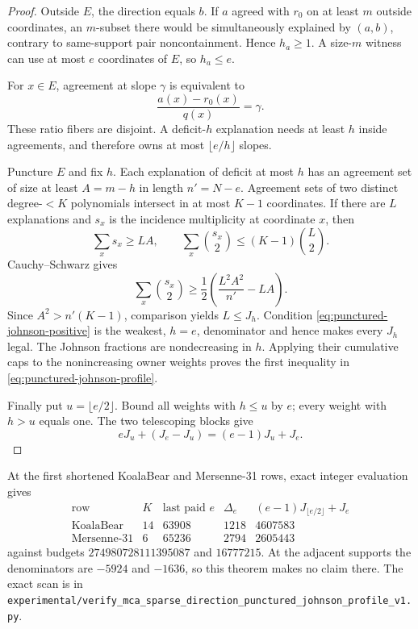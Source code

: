 \documentclass[11pt,a4paper]{amsart}
\numberwithin{equation}{section}
\theoremstyle{remark}
\begin{document}
\begin{proof}
Outside \(E\), the direction equals \(b\).  If \(a\) agreed with \(r_0\)
on at least \(m\) outside coordinates, an \(m\)-subset there would be
simultaneously explained by \((a,b)\), contrary to same-support
pair noncontainment.  Hence \(h_a\ge1\).  A size-\(m\) witness can use at
most \(e\) coordinates of \(E\), so \(h_a\le e\).

For \(x\in E\), agreement at slope \(\gamma\) is equivalent to
\[
  \frac{a(x)-r_0(x)}{q(x)}=\gamma.
\]
These ratio fibers are disjoint.  A deficit-\(h\) explanation needs at
least \(h\) inside agreements, and therefore owns at most
\(\lfloor e/h\rfloor\) slopes.

Puncture \(E\) and fix \(h\).  Each explanation of deficit at most \(h\)
has an agreement set of size at least \(A=m-h\) in length \(n'=N-e\).
Agreement sets of two distinct degree-\(<K\) polynomials intersect in at
most \(K-1\) coordinates.  If there are \(L\) explanations and \(s_x\)
is the incidence multiplicity at coordinate \(x\), then
\[
 \sum_xs_x\ge LA,
 \qquad
 \sum_x\binom{s_x}{2}\le(K-1)\binom L2.
\]
Cauchy--Schwarz gives
\[
 \sum_x\binom{s_x}{2}\ge
 \frac12\left(\frac{L^2A^2}{n'}-LA\right).
\]
Since \(A^2>n'(K-1)\), comparison yields \(L\le J_h\).  Condition
\eqref{eq:punctured-johnson-positive} is the weakest, \(h=e\), denominator and hence makes
every \(J_h\) legal.  The Johnson fractions are nondecreasing in \(h\).
Applying their cumulative caps to the nonincreasing owner weights proves
the first inequality in \eqref{eq:punctured-johnson-profile}.

Finally put \(u=\lfloor e/2\rfloor\).  Bound all weights with \(h\le u\)
by \(e\); every weight with \(h>u\) equals one.  The two telescoping blocks
give
\[
 eJ_u+(J_e-J_u)=(e-1)J_u+J_e.
\]
\end{proof}

\begin{remark}
At the first shortened KoalaBear and Mersenne-31 rows, exact integer
evaluation gives
\[
\begin{array}{c|c|c|c|c}
\text{row}&K&\text{last paid }e&\Delta_e&
 (e-1)J_{\lfloor e/2\rfloor}+J_e\\ \hline
\text{KoalaBear}&14&63908&1218&4607583\\
\text{Mersenne-31}&6&65236&2794&2605443
\end{array}
\]
against budgets \(274980728111395087\) and \(16777215\).  At the adjacent
supports the denominators are \(-5924\) and \(-1636\), so this theorem
makes no claim there.  The exact scan is in
\texttt{experimental/verify\_mca\_sparse\_direction\_punctured\_johnson\_profile\_v1.py}.
\end{remark}
\end{document}
